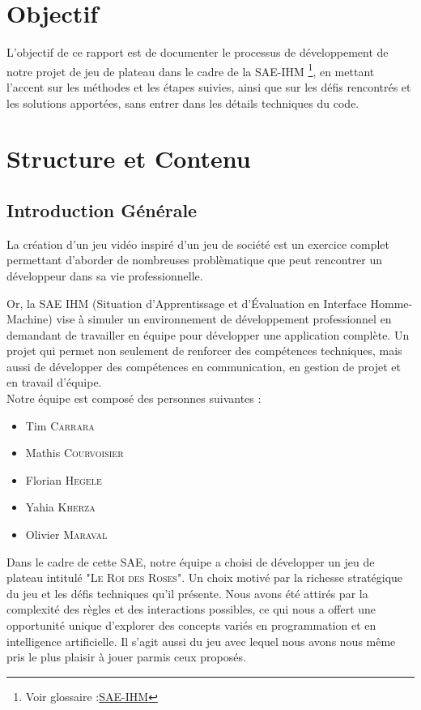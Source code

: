 \chapter{Objectif}

L'objectif de ce rapport est de documenter le processus de développement de notre projet de jeu de plateau dans le cadre de la SAE-IHM \footnote{Voir glossaire :\hyperref[sae-ihm]{SAE-IHM}}, en mettant l'accent sur les méthodes et les étapes suivies, ainsi que sur les défis rencontrés et les solutions apportées, sans entrer dans les détails techniques du code.

\chapter{Structure et Contenu}

\section{Introduction Générale}

La création d’un jeu vidéo inspiré d’un jeu de société est un exercice complet permettant d’aborder de nombreuses problèmatique que peut rencontrer un développeur dans sa vie professionnelle.

Or, la SAE IHM (Situation d'Apprentissage et d'Évaluation en Interface Homme-Machine) vise à simuler un environnement de développement professionnel en demandant de travailler en équipe pour développer une application complète.
Un projet qui permet non seulement de renforcer des compétences techniques, mais aussi de développer des compétences en communication, en gestion de projet et en travail d'équipe. \\

Notre équipe est composé des personnes suivantes :
\begin{itemize}
    \item Tim \textsc{Carrara}
    \item Mathis \textsc{Courvoisier}
    \item Florian \textsc{Hegele}
    \item Yahia \textsc{Kherza}
    \item Olivier \textsc{Maraval}\\
\end{itemize}

Dans le cadre de cette SAE, notre équipe a choisi de développer un jeu de plateau intitulé "\textsc{Le Roi des Roses}".
Un choix motivé par la richesse stratégique du jeu et les défis techniques qu'il présente.
Nous avons été attirés par la complexité des règles et des interactions possibles, ce qui nous a offert une opportunité unique d'explorer des concepts variés en programmation et en intelligence artificielle.
Il s’agit aussi du jeu avec lequel nous avons nous même pris le plus plaisir à jouer parmis ceux proposés.\\

